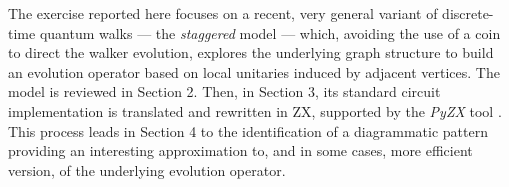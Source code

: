 The exercise reported here focuses on a recent, very general variant of discrete-time quantum walks --- the \emph{staggered}
 model  \cite{PortugalSFG16} --- which, avoiding the use of a coin to direct the walker evolution, explores the underlying graph structure to build an evolution operator based on local unitaries induced by adjacent vertices.  The model is reviewed in Section 2. Then, in Section 3, its standard circuit implementation is translated and rewritten in ZX, supported by  the \textit{PyZX} tool \cite{pyzx}. This process leads in Section 4 to the identification of a diagrammatic pattern providing an interesting approximation to, and in some cases,  more efficient version, of the underlying evolution operator.  




